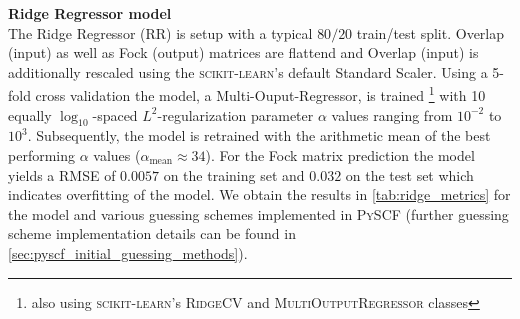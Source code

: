 \textbf{Ridge Regressor model}\\ %
The Ridge Regressor (RR) is setup with a typical $80 / 20$ train/test split. Overlap (input) as well as Fock (output) matrices are flattend and Overlap (input) is additionally rescaled using the \textsc{scikit-learn}'s default Standard Scaler. \parencite{ref:sk-learn} Using a 5-fold cross validation the model, a Multi-Ouput-Regressor, is trained \footnote{also using \textsc{scikit-learn}'s \textsc{RidgeCV} and \textsc{MultiOutputRegressor} classes} with 10 equally $\log_{10}$-spaced $L^2$-regularization parameter $\alpha$ values ranging from $10^{-2}$ to $10^{3}$. Subsequently, the model is retrained with the arithmetic mean of the best performing $\alpha$ values ($\alpha_{\text{mean}} \approx 34$). %
For the Fock matrix prediction the model yields a RMSE of $0.0057$ on the training set and $0.032$ on the test set which indicates overfitting of the model. We obtain the results in \autoref{tab:ridge_metrics} for the model and various guessing schemes implemented in \textsc{PySCF} (further guessing scheme implementation details can be found in \autoref{sec:pyscf_initial_guessing_methods}).


